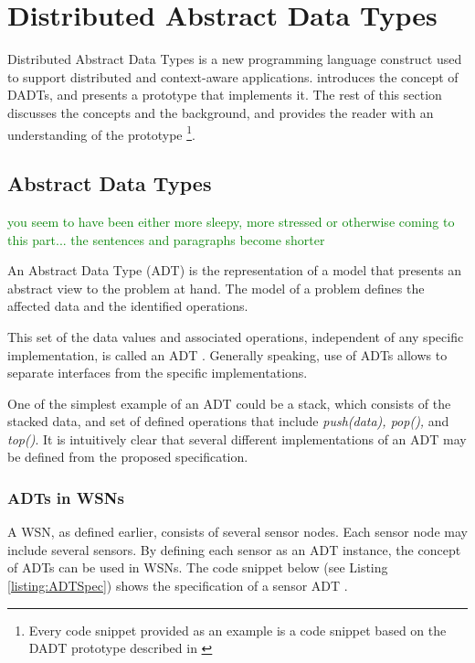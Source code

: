 \section {Distributed Abstract Data Types} \label{sec:DADT}

Distributed Abstract Data Types is a new programming language construct used to
support distributed and context-aware applications. \cite{migliavacca_DADT:2006}
introduces the concept of DADTs, and presents a prototype that implements it.
The rest of this section discusses the concepts and the background, and
provides the reader with an understanding of the prototype \footnote{Every code snippet provided as an example is a code snippet based on
the DADT prototype described in \cite{migliavacca_DADT:2006}}.

\subsection{Abstract Data Types}

\textcolor{green}{you seem to have been either more sleepy, more stressed or otherwise coming to this part...
the sentences and paragraphs become shorter}

An Abstract Data Type (ADT) is the representation of a model that presents an
abstract view to the problem at hand. The model of a problem defines the
affected data and the identified operations.

This set of the data values and associated operations, independent of any
specific implementation, is called an ADT \cite{NIST_website}. Generally
speaking, use of ADTs allows to separate interfaces from the specific
implementations.

One of the simplest example of an ADT could be a stack, which
consists of the stacked data, and set of defined operations that include
\emph{push(data), pop(),} and \emph{top()}. It is intuitively clear that
several different implementations of an ADT may be defined from the proposed specification.

\subsubsection{ADTs in WSNs} \label{subsubsec:ADTsinWSN}

A WSN, as defined earlier, consists of several sensor nodes. Each sensor node
may include several sensors. By defining each sensor as
an ADT instance, the concept of ADTs can be used in WSNs. The code snippet
below (see Listing \ref{listing:ADTSpec}) shows the specification of a sensor ADT .   

